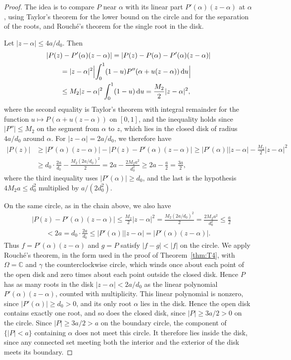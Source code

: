 \begin{proof}
The idea is to compare $P$ near $\alpha$ with its linear part
$P'(\alpha)(z-\alpha)$ at $\alpha$, using Taylor's theorem for the lower
bound on the circle and for the separation of the roots, and Rouch\'e's
theorem for the single root in the disk.

Let $|z-\alpha|\le4a/d_0$. Then
\begin{align*}
 &|P(z)-P'(\alpha)(z-\alpha)|
 =|P(z)-P(\alpha)-P'(\alpha)(z-\alpha)|\\
 &\qquad=|z-\alpha|^2\Bigl|\int_0^1(1-u)P''(\alpha+u(z-\alpha))\,\mathrm d u\Bigr|\\
 &\qquad\le M_2|z-\alpha|^2\int_0^1(1-u)\,\mathrm d u
 =\frac{M_2}2|z-\alpha|^2,
\end{align*}
where the second equality is Taylor's theorem with integral remainder for
the function $u\mapsto P(\alpha+u(z-\alpha))$ on $[0,1]$, and the
inequality holds since $|P''|\le M_2$ on the segment from $\alpha$ to $z$,
which lies in the closed disk of radius $4a/d_0$ around $\alpha$.
For $|z-\alpha|=2a/d_0$, we therefore have
\begin{align*}
 |P(z)|&\geq|P'(\alpha)(z-\alpha)|-|P(z)-P'(\alpha)(z-\alpha)|
 \geq|P'(\alpha)||z-\alpha|-\frac{M_2}2|z-\alpha|^2\\
 &\geq d_0\cdot\frac{2a}{d_0}-\frac{M_2(2a/d_0)^2}2
 =2a-\frac{2M_2a^2}{d_0^2}
 \geq2a-\frac a2
 =\frac{3a}2,
\end{align*}
where the third inequality uses $|P'(\alpha)|\ge d_0$, and the last is the
hypothesis $4M_2a\le d_0^2$ multiplied by $a/(2d_0^2)$.

On the same circle, as in the chain above, we also have
\begin{align*}
 &|P(z)-P'(\alpha)(z-\alpha)|
 \le\frac{M_2}2|z-\alpha|^2
 =\frac{M_2(2a/d_0)^2}2
 =\frac{2M_2a^2}{d_0^2}
 \le\frac a2\\
 &\qquad<2a
 =d_0\cdot\frac{2a}{d_0}
 \le|P'(\alpha)||z-\alpha|
 =|P'(\alpha)(z-\alpha)|.
\end{align*}
Thus $f=P'(\alpha)(z-\alpha)$ and $g=P$ satisfy $|f-g|<|f|$ on the
circle. We apply Rouch\'e's theorem, in the form used in the proof of
Theorem~\ref{thm:T4}, with $\Omega=\mathbb C$ and $\gamma$ the
counterclockwise circle, which winds once about each point of the open
disk and zero times about each point outside the closed disk. Hence $P$
has as many roots in the disk $|z-\alpha|<2a/d_0$ as the linear
polynomial $P'(\alpha)(z-\alpha)$, counted with multiplicity.
This linear polynomial is nonzero, since $|P'(\alpha)|\ge d_0>0$, and its
only root $\alpha$ lies in the disk.
Hence the open disk contains exactly one root,
and so does the closed disk, since $|P|\ge3a/2>0$ on the circle.
Since $|P|\ge3a/2>a$ on the boundary circle, the component of $\{|P|<a\}$
containing $\alpha$ does not meet this circle. It therefore lies inside
the disk, since any connected set meeting both the interior and the
exterior of the disk meets its boundary.


\end{proof}

